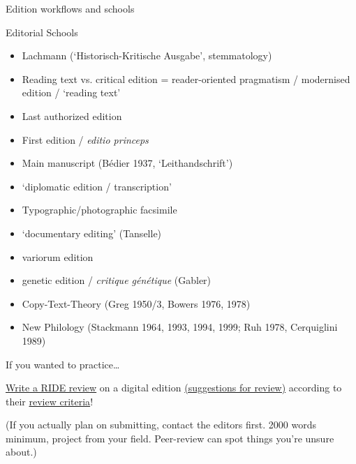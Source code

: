 \begin{frame}[allowframebreaks]{Edition workflows and schools}
\begin{block}{Editorial Schools}
\begin{multicols}{2}
\begin{itemize}
\item Lachmann (`Historisch-Kritische Ausgabe', stemmatology)
\item Reading text vs. critical edition = reader-oriented pragmatism / modernised edition / `reading text'
\item  Last authorized edition
\item  First edition / \emph{editio princeps}
\item Main manuscript (Bédier 1937, `Leithandschrift')
\item `diplomatic edition / transcription'
\item Typographic/photographic facsimile
\item `documentary editing' (Tanselle)
\item variorum edition
\item genetic edition / \emph{critique génétique} (Gabler)
\item Copy-Text-Theory (Greg 1950/3, Bowers 1976, 1978)
\item New Philology (Stackmann 1964, 1993, 1994, 1999; Ruh 1978, Cerquiglini 1989)
\end{itemize}
\end{multicols}
\end{block}

\end{frame}





\begin{frame}[standout]

  \alert{If you wanted to practice\dots}
  
  \normalsize
  \href{https://ride.i-d-e.de/reviewers/call-for-reviews/}{Write a RIDE review} on a digital edition \alert{\href{https://ride.i-d-e.de/reviewers/suggested-projects-for-review/}{(suggestions for review)}} according to their \alert{\href{https://ride.i-d-e.de/reviewers/submission-guidelines/}{review criteria}}!
  
  \footnotesize (If you actually plan on submitting, contact the editors first. 2000 words minimum, project from your field. Peer-review can spot things you're unsure about.)
\end{frame}
